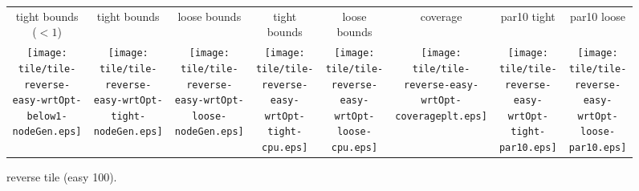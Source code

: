 \documentclass[a4paper,landscape]{article}
\begin{document}
\begin{figure}[t]
	\centering
    \begin{tabular}{c c c c c c c c}
	    tight bounds ($<1$) & tight bounds & loose bounds & tight bounds & loose bounds & coverage & par10 tight & par10 loose\\
	   \begin{minipage}{\cpufigureplotwidth}
      \texttt{[image: tile/tile-reverse-easy-wrtOpt-below1-nodeGen.eps]}
        \end{minipage}&
        \begin{minipage}{\cpufigureplotwidth}
        \texttt{[image: tile/tile-reverse-easy-wrtOpt-tight-nodeGen.eps]}
        \end{minipage}&
        \begin{minipage}{\cpufigureplotwidth}
      \texttt{[image: tile/tile-reverse-easy-wrtOpt-loose-nodeGen.eps]}
      \end{minipage}&
        \begin{minipage}{\cpufigureplotwidth}
        \texttt{[image: tile/tile-reverse-easy-wrtOpt-tight-cpu.eps]}
        \end{minipage}&
        \begin{minipage}{\cpufigureplotwidth}
        \texttt{[image: tile/tile-reverse-easy-wrtOpt-loose-cpu.eps]}
        \end{minipage}&
        \begin{minipage}{\cpufigureplotwidth}
        \texttt{[image: tile/tile-reverse-easy-wrtOpt-coverageplt.eps]}
        \end{minipage}&
        \begin{minipage}{\cpufigureplotwidth}
        \texttt{[image: tile/tile-reverse-easy-wrtOpt-tight-par10.eps]}
        \end{minipage}&
        \begin{minipage}{\cpufigureplotwidth}
        \texttt{[image: tile/tile-reverse-easy-wrtOpt-loose-par10.eps]}
        \end{minipage}
	\end{tabular}
\caption{reverse tile (easy 100).}
\label{fig:tile-reverse-easy}
\end{figure}
\end{document}
